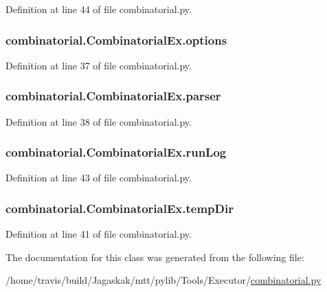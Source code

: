Definition at line 44 of file combinatorial.\-py.

\hypertarget{classcombinatorial_1_1CombinatorialEx_a20eda525b3947495bb6084c560dcca27}{
\subsubsection[{options}]{\setlength{\rightskip}{0pt plus 5cm}combinatorial.\-Combinatorial\-Ex.\-options}}\label{classcombinatorial_1_1CombinatorialEx_a20eda525b3947495bb6084c560dcca27}


Definition at line 37 of file combinatorial.\-py.

\hypertarget{classcombinatorial_1_1CombinatorialEx_ab5c27fece8991a34f47e85870637fc91}{
\subsubsection[{parser}]{\setlength{\rightskip}{0pt plus 5cm}combinatorial.\-Combinatorial\-Ex.\-parser}}\label{classcombinatorial_1_1CombinatorialEx_ab5c27fece8991a34f47e85870637fc91}


Definition at line 38 of file combinatorial.\-py.

\hypertarget{classcombinatorial_1_1CombinatorialEx_a3de3f7da4c201525da8452258df0bc7b}{
\subsubsection[{run\-Log}]{\setlength{\rightskip}{0pt plus 5cm}combinatorial.\-Combinatorial\-Ex.\-run\-Log}}\label{classcombinatorial_1_1CombinatorialEx_a3de3f7da4c201525da8452258df0bc7b}


Definition at line 43 of file combinatorial.\-py.

\hypertarget{classcombinatorial_1_1CombinatorialEx_a24b3bc621a8380e406bade192bc371d4}{
\subsubsection[{temp\-Dir}]{\setlength{\rightskip}{0pt plus 5cm}combinatorial.\-Combinatorial\-Ex.\-temp\-Dir}}\label{classcombinatorial_1_1CombinatorialEx_a24b3bc621a8380e406bade192bc371d4}


Definition at line 41 of file combinatorial.\-py.



The documentation for this class was generated from the following file\-:\begin{DoxyCompactItemize}
\item 
/home/travis/build/\-Jagaskak/mtt/pylib/\-Tools/\-Executor/\hyperlink{combinatorial_8py}{combinatorial.\-py}\end{DoxyCompactItemize}
